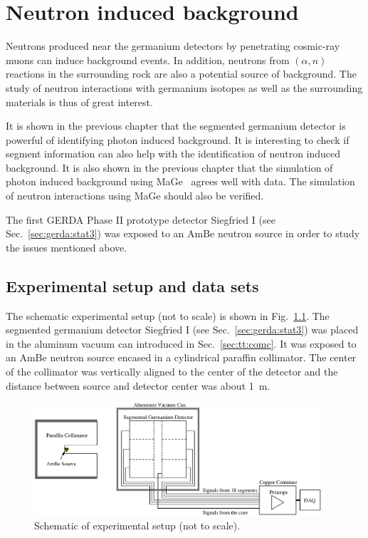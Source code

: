 \chapter{Neutron induced background}
\label{cha:neutron}
Neutrons produced near the germanium detectors by penetrating cosmic-ray muons can induce background events. In addition, neutrons from $(\alpha, n)$ reactions in the surrounding rock are also a potential source of background. The study of neutron interactions with germanium isotopes as well as the surrounding materials is thus of great interest.

It is shown in the previous chapter that the segmented germanium detector is powerful of identifying photon induced background. It is interesting to check if segment information can also help with the identification of neutron induced background. It is also shown in the previous chapter that the simulation of photon induced background using MaGe~\cite{Mag06, Mag08} agrees well with data. The simulation of neutron interactions using MaGe should also be verified.

The first GERDA Phase II prototype detector Siegfried I (see Sec.~\ref{sec:gerda:stat3}) was exposed to an AmBe neutron source in order to study the issues mentioned above.

\section{Experimental setup and data sets}
\label{sec:neu:exp}
The schematic experimental setup (not to scale) is shown in Fig.~\ref{fig:neu:exp}. The segmented germanium detector Siegfried I (see Sec.~\ref{sec:gerda:stat3}) was placed in the aluminum vacuum can introduced in Sec.~\ref{sec:tt:comc}. It was exposed to an AmBe neutron source encased in a cylindrical paraffin collimator. The center of the collimator was vertically aligned to the center of the detector and the distance between source and detector center was about 1~m.

\begin{figure}[tbhp]
  \centering
  \includegraphics[width=0.95\textwidth]{neuExpSI}
  \caption{Schematic of experimental setup (not to scale).}
  \label{fig:neu:exp}
\end{figure}

